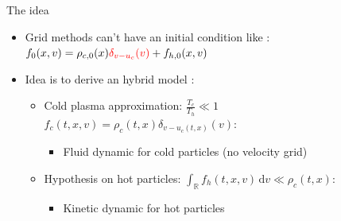 \documentclass{beamer}
\newcommand{\arrow}{{\color{PLB}\ding{220}}}
\begin{document}
\begin{frame}{The idea}
  \begin{itemize}
    \item Grid methods can't have an initial condition like : $f_0(x,v) = \rho_{c,0}(x){\color{red}\delta_{v-u_c}(v)} + f_{h,0}(x,v)$
    \item Idea is to derive an hybrid model : \begin{itemize}
      \item Cold plasma approximation: $\!\!\frac{T_c}{T_h}\! \ll\! 1$\ \arrow\ $f_c(t,x,v)\! =\! \rho_c(t,x)\delta_{v-u_c(t,x)}(\!v\!)$: \begin{itemize}
        \item Fluid dynamic for cold particles (no velocity grid)
      \end{itemize}
      \item Hypothesis on hot particles: $\int_\mathbb{R} f_h(t,x,v)\,\mathrm{d}v \ll \rho_c(t,x)$: \begin{itemize}
        \item Kinetic dynamic for hot particles
      \end{itemize}
    \end{itemize}
  \end{itemize}
\end{frame}
\end{document}

